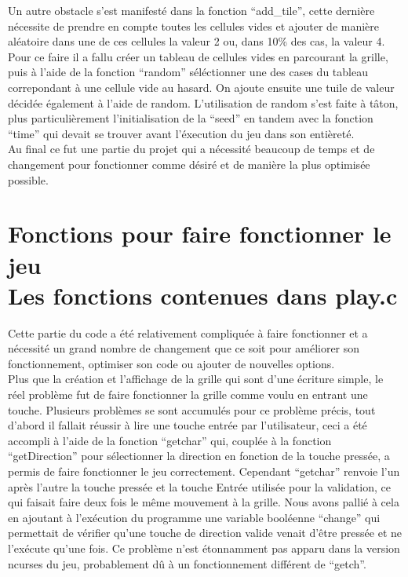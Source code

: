 \documentclass[12pt]{article}
\begin{document}
Un autre obstacle s'est manifesté dans la fonction ``add\_tile'', cette dernière nécessite de prendre en compte toutes les cellules vides et ajouter de manière aléatoire dans une de ces cellules la valeur 2 ou, dans 10\% des cas, la valeur 4.\\

Pour ce faire il a fallu créer un tableau de cellules vides en parcourant la grille, puis à l'aide de la fonction ``random'' séléctionner une des cases du tableau correpondant à une cellule vide au hasard. On ajoute ensuite une tuile de valeur décidée également à l'aide de random. L'utilisation de random s'est faite à tâton, plus particulièrement l'initialisation de la ``seed'' en tandem avec la fonction ``time'' qui devait se trouver avant l'éxecution du jeu dans son entièreté.\\

Au final ce fut une partie du projet qui a nécessité beaucoup de temps et de changement pour fonctionner comme désiré et de manière la plus optimisée possible.

\section{Fonctions pour faire fonctionner le jeu
\\{\small Les fonctions contenues dans play.c}}

Cette partie du code a été relativement compliquée à faire fonctionner et a nécessité un grand nombre de changement que ce soit pour améliorer son fonctionnement, optimiser son code ou ajouter de nouvelles options.\\

Plus que la création et l'affichage de la grille qui sont d'une écriture simple, le réel problème fut de faire fonctionner la grille comme voulu en entrant une touche. Plusieurs problèmes se sont accumulés pour ce problème précis, tout d'abord il fallait réussir à lire une touche entrée par l'utilisateur, ceci a été accompli à l'aide de la fonction ``getchar'' qui, couplée à la fonction ``getDirection'' pour sélectionner la direction en fonction de la touche pressée, a permis de faire fonctionner le jeu correctement. Cependant ``getchar'' renvoie l'un après l'autre la touche pressée et la touche Entrée utilisée pour la validation, ce qui faisait faire deux fois le même mouvement à la grille. Nous avons pallié à cela en ajoutant à l'exécution du programme une variable booléenne ``change'' qui permettait de vérifier qu'une touche de direction valide venait d'être pressée et ne l'exécute qu'une fois. Ce problème n'est étonnamment pas apparu dans la version ncurses du jeu, probablement dû à un fonctionnement différent de ``getch''.\\
\end{document}
